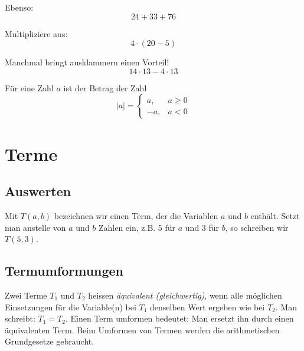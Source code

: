\begin{example}
Ebenso:
\[
	24+33+76
\]
\end{example}

\begin{example}
Multipliziere aus:
\[
	4\cdot (20-5)
\]
\end{example}

\begin{example}
Manchmal bringt ausklammern einen Vorteil!
\[
	14\cdot 13 - 4\cdot 13
\]
\end{example}

\begin{tcolorbox}[colback=green!10!white,colframe=green!70!black,title=Betrag einer Zahl,width=.9\linewidth]
		Für eine Zahl $a$ ist der Betrag der Zahl
		\[
			|a|=\left\{\begin{array}{ll} a, & a\ge 0 \\
         -a, & a<0\end{array}\right.
		\]
\end{tcolorbox}


\section{Terme}
\subsection*{Auswerten}
Mit $T(a,b)$ bezeichnen wir einen Term, der die Variablen $a$ und $b$ enthält. Setzt man anstelle von $a$ und $b$ Zahlen ein, z.B. 5 für $a$ und 3 für $b$, so schreiben wir $T(5,3)$.
\vspace{1cm}

\subsection*{Termumformungen}
Zwei Terme $T_1$ und $T_2$ heissen \emph{äquivalent (gleichwertig)}, wenn alle möglichen Einsetzungen für die Variable(n) bei $T_1$ denselben Wert ergeben wie bei $T_2$.
Man schreibt: $T_1 = T_2$.
\vspace{5mm}
Einen Term umformen bedeutet:
Man ersetzt ihn durch einen äquivalenten Term. Beim Umformen von Termen werden die arithmetischen Grundgesetze gebraucht.

